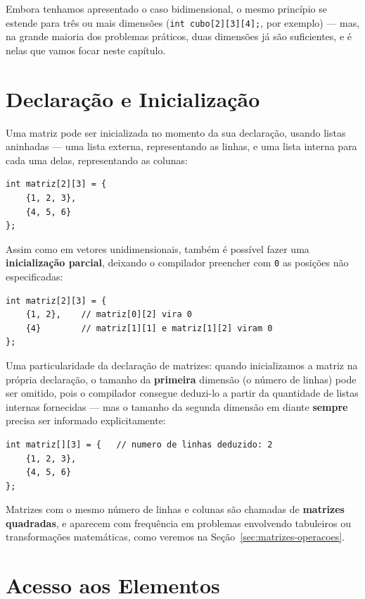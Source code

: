 Embora tenhamos apresentado o caso bidimensional, o mesmo princípio se estende para três ou mais dimensões (\texttt{int cubo[2][3][4];}, por exemplo) — mas, na grande maioria dos problemas práticos, duas dimensões já são suficientes, e é nelas que vamos focar neste capítulo.

\section{Declaração e Inicialização}

Uma matriz pode ser inicializada no momento da sua declaração, usando listas aninhadas — uma lista externa, representando as linhas, e uma lista interna para cada uma delas, representando as colunas:

\begin{lstlisting}
int matriz[2][3] = {
    {1, 2, 3},
    {4, 5, 6}
};
\end{lstlisting}

Assim como em vetores unidimensionais, também é possível fazer uma \textbf{inicialização parcial}, deixando o compilador preencher com \texttt{0} as posições não especificadas:

\begin{lstlisting}
int matriz[2][3] = {
    {1, 2},    // matriz[0][2] vira 0
    {4}        // matriz[1][1] e matriz[1][2] viram 0
};
\end{lstlisting}

Uma particularidade da declaração de matrizes: quando inicializamos a matriz na própria declaração, o tamanho da \textbf{primeira} dimensão (o número de linhas) pode ser omitido, pois o compilador consegue deduzi-lo a partir da quantidade de listas internas fornecidas — mas o tamanho da segunda dimensão em diante \textbf{sempre} precisa ser informado explicitamente:

\begin{lstlisting}
int matriz[][3] = {   // numero de linhas deduzido: 2
    {1, 2, 3},
    {4, 5, 6}
};
\end{lstlisting}

Matrizes com o mesmo número de linhas e colunas são chamadas de \textbf{matrizes quadradas}, e aparecem com frequência em problemas envolvendo tabuleiros ou transformações matemáticas, como veremos na Seção~\ref{sec:matrizes-operacoes}.

\section{Acesso aos Elementos}


